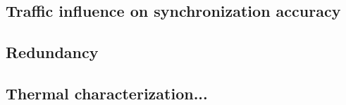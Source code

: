 
\subsection{Traffic influence on synchronization accuracy}


\subsection{Redundancy}


\subsection{Thermal characterization...}


 
